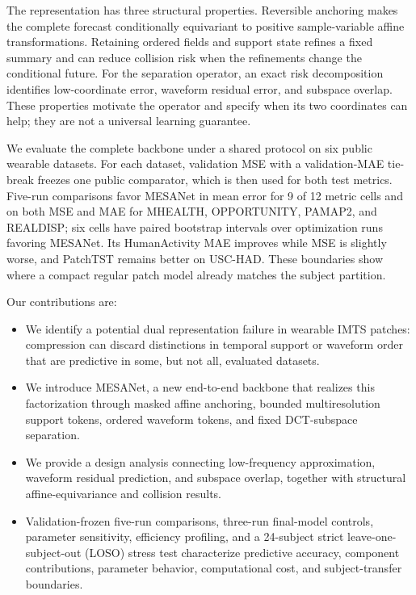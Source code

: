 The representation has three structural properties. Reversible anchoring makes
the complete forecast conditionally equivariant to positive sample-variable
affine transformations. Retaining ordered fields and support state refines a
fixed summary and can reduce collision risk when the refinements change the
conditional future. For the separation operator, an exact risk decomposition
identifies low-coordinate error, waveform residual error, and subspace overlap.
These properties motivate the operator and specify when its two coordinates can
help; they are not a universal learning guarantee.

We evaluate the complete backbone under a shared protocol on six public
wearable datasets. For each dataset, validation MSE with a validation-MAE
tie-break freezes one public comparator, which is then used for both test
metrics. Five-run comparisons favor MESANet in mean error for 9 of 12 metric
cells and on both MSE and MAE for MHEALTH, OPPORTUNITY, PAMAP2, and REALDISP;
six cells have paired bootstrap intervals over optimization runs favoring
MESANet. Its
HumanActivity MAE improves while MSE is slightly worse, and PatchTST remains
better on USC-HAD. These boundaries show where a compact regular patch model
already matches the subject partition.

Our contributions are:
\begin{itemize}
  \item We identify a potential dual representation failure in wearable IMTS
  patches: compression can discard distinctions in temporal support or
  waveform order that are predictive in some, but not all, evaluated datasets.
  \item We introduce MESANet, a new end-to-end backbone that realizes this
  factorization through masked affine anchoring, bounded multiresolution
  support tokens, ordered waveform tokens, and fixed DCT-subspace separation.
  \item We provide a design analysis connecting low-frequency approximation,
  waveform residual prediction, and subspace overlap, together with structural
  affine-equivariance and collision results.
  \item Validation-frozen five-run comparisons, three-run final-model controls,
  parameter sensitivity, efficiency profiling, and a 24-subject strict
  leave-one-subject-out (LOSO)
  stress test characterize predictive accuracy, component contributions,
  parameter behavior, computational cost, and subject-transfer boundaries.
\end{itemize}
